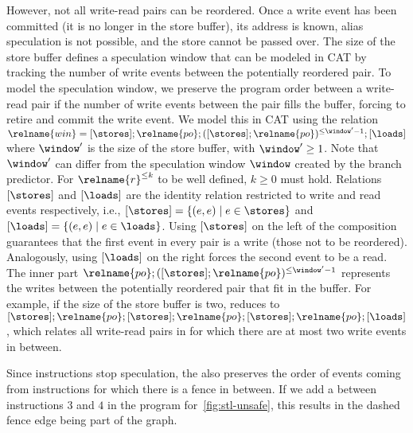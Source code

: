 \documentclass[conference]{IEEEtran}
\begin{document}
However, not all write-read pairs can be reordered.
Once a write event has been committed (it is no longer in the store buffer), its address is known, alias speculation is not possible, and the store cannot be passed over.
The size of the store buffer defines a speculation window that can be modeled in CAT by tracking the number of write events between the potentially reordered pair.
To model the speculation window, we preserve the program order between a write-read pair if the number of write events between the pair fills the buffer, forcing to retire and commit the write event.
We model this in CAT using the relation $\relname{win} = {[\stores] ; \relname{po} ; ([\stores] ; \relname{po})^{\leq \window' -1} ; [\loads]}$ where $\window'$ is the size of the store buffer, with $\window'  \geq 1$.
Note that $\window'$ can differ from the speculation window $\window$ created by the branch predictor.
For $\relname{r}^{\leq k}$ to be well defined, $k \geq 0$ must hold.
Relations $[\stores]$ and $[\loads]$ are the identity relation restricted to write and read events respectively, i.e., $[\stores] = \{ (e,e) \mid e \in \stores \}$ and $[\loads] = \{ (e,e) \mid e \in \loads \}$.
Using $[\stores]$ on the left of the composition guarantees that the first event in every pair is a write (those not to be reordered).
Analogously, using $[\loads]$ on the right forces the second event to be a read.
The inner part $\relname{po} ; ([\stores] ; \relname{po})^{\leq \window' -1}$ represents the writes between the potentially reordered pair that fit in the buffer.
For example, if the size of the store buffer is two,  reduces to ${[\stores] ; \relname{po} ; [\stores] ; \relname{po} ; [\stores] ; \relname{po} ; [\loads]}$, which relates all write-read pairs in  for which there are at most two write events in between.

Since \fence instructions stop speculation, the  also preserves the order of events coming from instructions for which there is a fence in between. 
If we add a \fence between instructions $3$ and $4$ in the \masm program for~\autoref{fig:stl-unsafe}, this results in the dashed fence edge being part of the graph.
\end{document}

